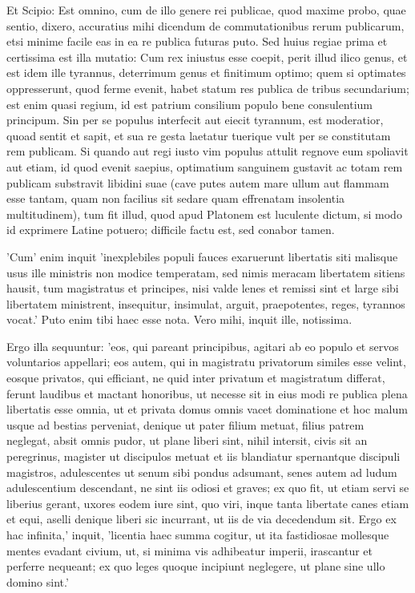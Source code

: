  Et Scipio: Est omnino, cum de illo genere rei publicae, quod maxime probo, quae sentio, dixero, accuratius mihi dicendum de commutationibus rerum publicarum, etsi minime facile eas in ea re publica futuras puto. Sed huius regiae prima et certissima est illa mutatio: Cum rex iniustus esse coepit, perit illud ilico genus, et est idem ille tyrannus, deterrimum genus et finitimum optimo; quem si optimates oppresserunt, quod ferme evenit, habet statum res publica de tribus secundarium; est enim quasi regium, id est patrium consilium populo bene consulentium principum. Sin per se populus interfecit aut eiecit tyrannum, est moderatior, quoad sentit et sapit, et sua re gesta laetatur tuerique vult per se constitutam rem publicam. Si quando aut regi iusto vim populus attulit regnove eum spoliavit aut etiam, id quod evenit saepius, optimatium sanguinem gustavit ac totam rem publicam substravit libidini suae (cave putes autem mare ullum aut flammam esse tantam, quam non facilius sit sedare quam effrenatam insolentia multitudinem), tum fit illud, quod apud Platonem est luculente dictum, si modo id exprimere Latine potuero; difficile factu est, sed conabor tamen.

 'Cum' enim inquit 'inexplebiles populi fauces exaruerunt libertatis siti malisque usus ille ministris non modice temperatam, sed nimis meracam libertatem sitiens hausit, tum magistratus et principes, nisi valde lenes et remissi sint et large sibi libertatem ministrent, insequitur, insimulat, arguit, praepotentes, reges, tyrannos vocat.' Puto enim tibi haec esse nota. Vero mihi, inquit ille, notissima.

 Ergo illa sequuntur: 'eos, qui pareant principibus, agitari ab eo populo et servos voluntarios appellari; eos autem, qui in magistratu privatorum similes esse velint, eosque privatos, qui efficiant, ne quid inter privatum et magistratum differat, ferunt laudibus et mactant honoribus, ut necesse sit in eius modi re publica plena libertatis esse omnia, ut et privata domus omnis vacet dominatione et hoc malum usque ad bestias perveniat, denique ut pater filium metuat, filius patrem neglegat, absit omnis pudor, ut plane liberi sint, nihil intersit, civis sit an peregrinus, magister ut discipulos metuat et iis blandiatur spernantque discipuli magistros, adulescentes ut senum sibi pondus adsumant, senes autem ad ludum adulescentium descendant, ne sint iis odiosi et graves; ex quo fit, ut etiam servi se liberius gerant, uxores eodem iure sint, quo viri, inque tanta libertate canes etiam et equi, aselli denique liberi sic incurrant, ut iis de via decedendum sit. Ergo ex hac infinita,' inquit, 'licentia haec summa cogitur, ut ita fastidiosae mollesque mentes evadant civium, ut, si minima vis adhibeatur imperii, irascantur et perferre nequeant; ex quo leges quoque incipiunt neglegere, ut plane sine ullo domino sint.'

